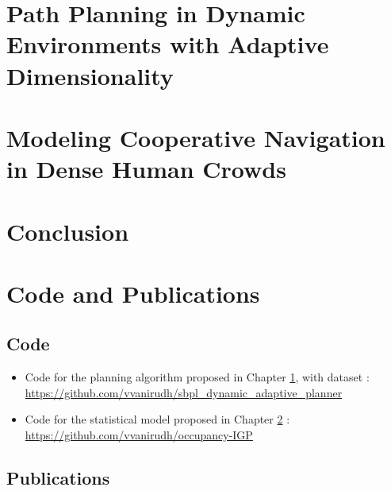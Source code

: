 \documentclass[twoside,10pt]{report}
\begin{document}
\clearpage

\chapter{Path Planning in Dynamic Environments with Adaptive Dimensionality}
\label{chap:ppad}


\clearpage

\chapter{Modeling Cooperative Navigation in Dense Human Crowds}
\label{chap:oigp}


\clearpage

%


\chapter{Conclusion}
\label{chap:conclusion}



\clearpage

\appendix
\chapter{Code and Publications}
\label{chap:code-and-datasets}

\section{Code}
\label{sec:code}
\begin{itemize}
\item Code for the planning algorithm proposed in Chapter \ref{chap:ppad}, with dataset : \url{https://github.com/vvanirudh/sbpl_dynamic_adaptive_planner}
\item Code for the statistical model proposed in Chapter \ref{chap:oigp} : \url{https://github.com/vvanirudh/occupancy-IGP}
\end{itemize}

\section{Publications}
\label{sec:publications}
\end{document}
